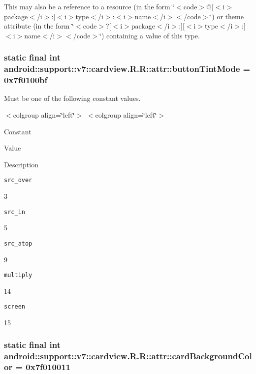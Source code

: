 This may also be a reference to a resource (in the form \char`\"{}$<$code$>$@\mbox{[}$<$i$>$package$<$/i$>$:\mbox{]}$<$i$>$type$<$/i$>$:$<$i$>$name$<$/i$>$$<$/code$>$\char`\"{}) or theme attribute (in the form \char`\"{}$<$code$>$?\mbox{[}$<$i$>$package$<$/i$>$:\mbox{]}\mbox{[}$<$i$>$type$<$/i$>$:\mbox{]}$<$i$>$name$<$/i$>$$<$/code$>$\char`\"{}) containing a value of this type. \hypertarget{classandroid_1_1support_1_1v7_1_1cardview_1_1_r_1_1attr_98f57890495f7b5f416a27f26f38f710}{
\subsubsection[{buttonTintMode}]{\setlength{\rightskip}{0pt plus 5cm}static final int android::support::v7::cardview.R.R::attr::buttonTintMode = 0x7f0100bf}}
\label{classandroid_1_1support_1_1v7_1_1cardview_1_1_r_1_1attr_98f57890495f7b5f416a27f26f38f710}


Must be one of the following constant values. \begin{TabularC}{0}
\hline
\end{TabularC}
$<$colgroup align=\char`\"{}left\char`\"{}$>$ $<$colgroup align=\char`\"{}left\char`\"{}$>$ 

Constant

Value

Description 

{\tt src\_\-over}

3

{\tt src\_\-in}

5

{\tt src\_\-atop}

9

{\tt multiply}

14

{\tt screen}

15\hypertarget{classandroid_1_1support_1_1v7_1_1cardview_1_1_r_1_1attr_1f33882098f073e24d7325c296ec9acd}{
\subsubsection[{cardBackgroundColor}]{\setlength{\rightskip}{0pt plus 5cm}static final int android::support::v7::cardview.R.R::attr::cardBackgroundColor = 0x7f010011}}
\label{classandroid_1_1support_1_1v7_1_1cardview_1_1_r_1_1attr_1f33882098f073e24d7325c296ec9acd}


